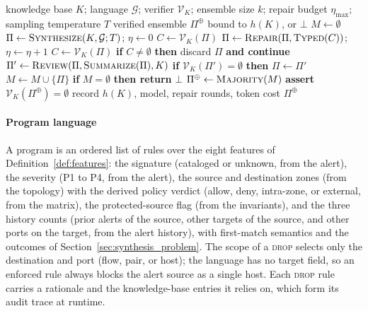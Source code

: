 \documentclass[final,5p]{elsarticle}
\begin{document}
\begin{algorithm}[!htbp]
\caption{Verification-guided response synthesis}
\label{alg:synthesis}
\small
\begin{algorithmic}[1]
\Require knowledge base $K$; language $\mathcal{G}$; verifier $\mathcal{V}_K$; ensemble size $k$; repair budget $\eta_{\max}$; sampling temperature $T$
\Ensure verified ensemble $\Pi^{\oplus}$ bound to $h(K)$, or $\bot$
\State $M \gets \emptyset$
    \State $\Pi \gets \textsc{Synthesize}(K,\mathcal{G};T)$; $\eta \gets 0$ 
    \State $C \gets \mathcal{V}_K(\Pi)$ 
        \State $\Pi \gets \textsc{Repair}(\Pi, \textsc{Typed}(C))$; $\eta \gets \eta+1$
        \State $C \gets \mathcal{V}_K(\Pi)$
    \EndWhile
    \State \textbf{if} $C\neq\emptyset$ \textbf{then} discard $\Pi$ \textbf{and continue}
    \State $\Pi' \gets \textsc{Review}(\Pi, \textsc{Summarize}(\Pi), K)$ 
    \State \textbf{if} $\mathcal{V}_K(\Pi')=\emptyset$ \textbf{then} $\Pi \gets \Pi'$
    \State $M \gets M\cup\{\Pi\}$
\EndFor
\State \textbf{if} $M=\emptyset$ \textbf{then return} $\bot$ 
\State $\Pi^{\oplus} \gets \textsc{Majority}(M)$ 
\State \textbf{assert} $\mathcal{V}_K(\Pi^{\oplus})=\emptyset$
\State record $h(K)$, model, repair rounds, token cost
\State \Return $\Pi^{\oplus}$
\end{algorithmic}
\end{algorithm}

\paragraph{Program language}
A program is an ordered list of rules over the eight features of Definition~\ref{def:features}: the signature (cataloged or unknown, from the alert), the severity (P1 to P4, from the alert), the source and destination zones (from the topology) with the derived policy verdict (allow, deny, intra-zone, or external, from the matrix), the protected-source flag (from the invariants), and the three history counts (prior alerts of the source, other targets of the source, and other ports on the target, from the alert history), with first-match semantics and the outcomes of Section~\ref{sec:synthesis_problem}. The scope of a \textsc{drop} selects only the destination and port (flow, pair, or host); the language has no target field, so an enforced rule always blocks the alert source as a single host. Each \textsc{drop} rule carries a rationale and the knowledge-base entries it relies on, which form its audit trace at runtime.
\end{document}
